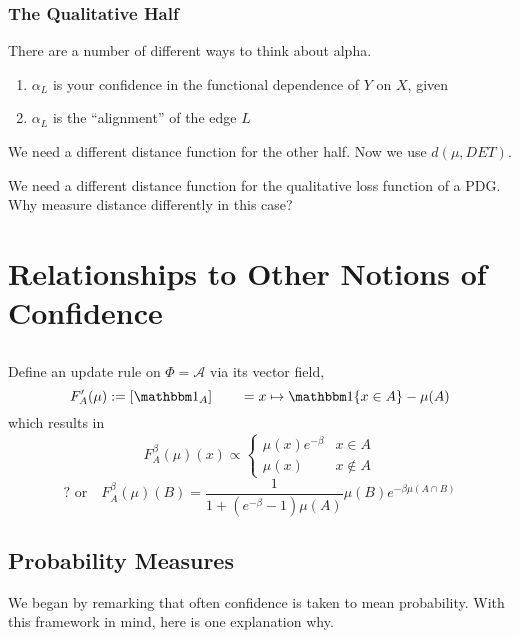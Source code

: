 \documentclass{article}
\begin{document}
\subsubsection*{The Qualitative Half}


There are a number of different ways to think about alpha.
\begin{enumerate}[nosep]
    \item $\alpha_L$ is your confidence in the functional dependence of $Y$ on $X$, given
    \item $\alpha_L$ is the ``alignment'' of the edge $L$
\end{enumerate}

We need a different distance function for the other half. Now we use
$d(\mu, DET)$.

%

We need a different distance function for the qualitative loss function of a PDG.
Why measure distance differently in this case?


\section{Relationships to Other Notions of Confidence}

\subsection{}

Define an update rule on $\Phi = \mathcal A$ via its vector field,
\[
    F'_A(\mu) := [ \mathbbm 1_{A} ]
     \qquad = x \mapsto \mathbbm1\{x \in A\} - \mu(A)
\]
which results in
\[
    F_A^\beta(\mu)(x) \propto
    \begin{cases}
        \mu(x) e^{-\beta} & x \in A \\
        \mu(x) & x \notin A
    \end{cases}
\]
\[\text{? or}\quad
    F_A^\beta(\mu) (B) =
    \frac{1}{1 + (e^{-\beta}-1) \mu(A) } \mu(B) e^{-\beta \mu(A \cap B)}
\]

\subsection{Probability Measures}

We began by remarking that often confidence is taken to mean probability.
With this framework in mind, here is one explanation why.
\end{document}
